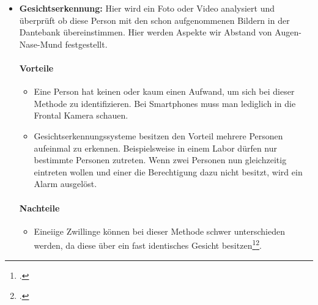 \begin{itemize}
	\paragraph{Nachteile}
	\begin{itemize}
		\item In dem Fall, dass sich eine Person auf dem Finger verletzt, kann es dazu führen, dass der Fingerabdruck sich verändert. Aus diesem Grund kann sich die Person möglicherweise nicht mehr identifizieren\footcite{fingerabdruck}.
	\end{itemize}
	\item \textbf{Gesichtserkennung:} Hier wird ein Foto oder Video analysiert und überprüft ob diese Person mit den schon aufgenommenen Bildern in der Dantebank übereinstimmen. Hier werden Aspekte wir Abstand von Augen-Nase-Mund festgestellt.
	\paragraph{Vorteile}
	\begin{itemize}
		\item Eine Person hat keinen oder kaum einen Aufwand, um sich bei dieser Methode zu identifizieren. Bei Smartphones muss man lediglich in die Frontal Kamera schauen.
		\item Gesichtserkennungssysteme besitzen den Vorteil mehrere Personen aufeinmal zu erkennen. Beispielsweise in einem Labor dürfen nur bestimmte Personen zutreten. Wenn zwei Personen nun gleichzeitig eintreten wollen und einer die Berechtigung dazu nicht besitzt, wird ein Alarm ausgelöst.
	\end{itemize}
	\paragraph{Nachteile}
	\begin{itemize}
		\item Eineiige Zwillinge können bei dieser Methode schwer unterschieden werden, da diese über ein fast identisches Gesicht besitzen\footcite{gesichtserkennung-1}\footcite{gesichtserkennung-2}.
	\end{itemize}
\end{itemize}

